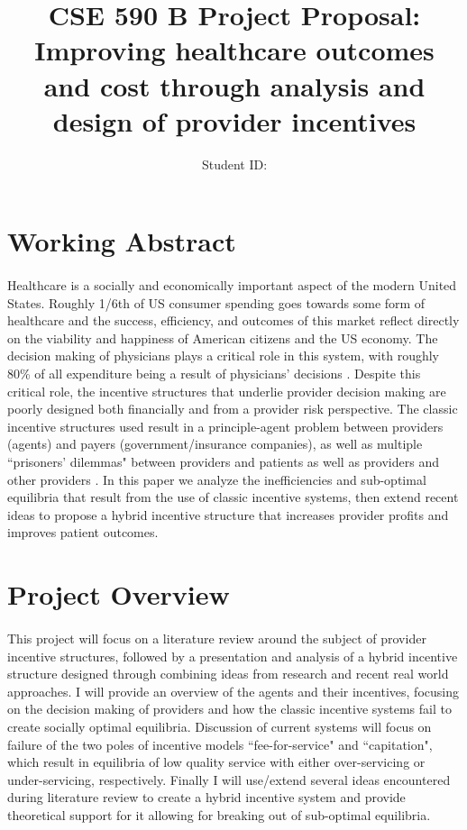\documentclass{article}
\title{\textbf{CSE 590 B Project Proposal: Improving healthcare outcomes and cost through analysis and design of provider incentives }}
\author{\studentname \qquad Student ID: \uwid}
\begin{document}
\maketitle

\section*{Working Abstract}

\paragraph{} Healthcare is a socially and economically important aspect of the modern United States. Roughly 1/6th of US consumer spending goes towards some form of healthcare \cite{econharvard} and the success, efficiency, and outcomes of this market reflect directly on the viability and happiness of American citizens and the US economy. The decision making of physicians plays a critical role in this system, with roughly 80\% of all expenditure being a result of physicians' decisions \cite{trust}. Despite this critical role, the incentive structures that underlie provider decision making are poorly designed both financially and from a provider risk perspective. The classic incentive structures used result in a principle-agent problem between providers (agents) and payers (government/insurance companies), as well as multiple ``prisoners' dilemmas" between providers and patients as well as providers and other providers \cite{blended}. In this paper we analyze the inefficiencies and sub-optimal equilibria that result from the use of classic incentive systems, then extend recent ideas to propose a hybrid incentive structure that increases provider profits and improves patient outcomes.

\section*{Project Overview}

\paragraph{} This project will focus on a literature review around the subject of provider incentive structures, followed by a presentation and analysis of a hybrid incentive structure designed through combining ideas from research and recent real world approaches. I will provide an overview of the agents and their incentives, focusing on the decision making of providers and how the classic incentive systems fail to create socially optimal equilibria. Discussion of current systems will focus on failure of the two poles of incentive models ``fee-for-service" and ``capitation", which result in equilibria of low quality service with either over-servicing or under-servicing, respectively. Finally I will use/extend several ideas encountered during literature review to create a hybrid incentive system and provide theoretical support for it allowing for breaking out of sub-optimal equilibria.
\end{document}
